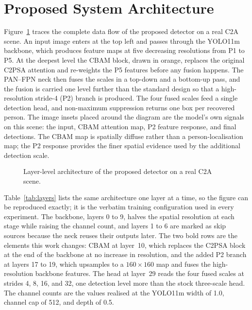 \documentclass[12pt,a4paper,oneside]{report}
\begin{document}
\section{Proposed System Architecture}
Figure~\ref{fig:fullarch} traces the complete data flow of the proposed
detector on a real C2A scene. An input image enters at the top left and passes
through the YOLO11m backbone, which produces feature maps at five decreasing
resolutions from P1 to P5. At the deepest level the CBAM block, drawn in
orange, replaces the original C2PSA attention and re-weights the P5 features
before any fusion happens. The PAN--FPN neck then fuses the scales in a
top-down and a bottom-up pass, and the fusion is carried one level further than
the standard design so that a high-resolution stride-4 (P2) branch is produced.
The four fused scales feed a single detection head, and non-maximum suppression
returns one box per recovered person. The image insets placed around the
  diagram are the model's own signals on this scene: the input, CBAM attention
  map, P2 feature response, and final detections. The CBAM map is spatially
  diffuse rather than a person-localisation map; the P2 response provides the
  finer spatial evidence used by the additional detection scale.

\begin{figure}[tbp]
  \centering
  \caption{Layer-level architecture of the proposed detector on a real C2A scene.}
  \label{fig:fullarch}
\end{figure}

Table~\ref{tab:layers} lists the same architecture one layer at a time, so the
figure can be reproduced exactly; it is the verbatim training configuration
used in every experiment. The backbone, layers 0 to 9, halves the spatial
resolution at each stage while raising the channel count, and layers 1 to 6 are
marked as skip sources because the neck reuses their outputs later. The two
bold rows are the elements this work changes: CBAM at layer~10, which replaces
the C2PSA block at the end of the backbone at no increase in resolution, and
the added P2 branch at layers 17 to 19, which upsamples to a $160\times160$ map
and fuses the high-resolution backbone features. The head at layer~29 reads the
four fused scales at strides 4, 8, 16, and 32, one detection level more than the
stock three-scale head. The channel counts are the values realised at the
YOLO11m width of 1.0, channel cap of 512, and depth of 0.5.
\end{document}
